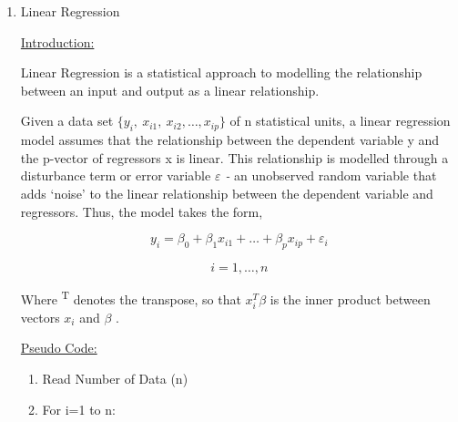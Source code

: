 \documentclass[12pt]{article}
\renewcommand{\_}{\kern-1.5pt\textunderscore\kern-1.5pt}
\begin{document}
\vspace{\baselineskip}
\begin{enumerate}
	\item {\fontsize{20pt}{24.0pt}\selectfont Linear Regression\par}\par

{\fontsize{14pt}{16.8pt}\selectfont \uline{Introduction:}\par}\par

Linear Regression is a statistical approach to modelling the relationship between an input and output as a linear relationship.\par

Given a data set  \(  \{ y_{i},~x_{i1},~x_{i2},  \ldots , x_{ip} \}  \)  of n statistical units, a linear regression model assumes that the relationship between the dependent variable y and the p-vector of regressors x is linear. This relationship is modelled through a disturbance term or error variable \textit{\textcolor[HTML]{202122}{$ \varepsilon $  -}}\textcolor[HTML]{202122}{ an unobserved random variable that adds ‘noise’ to the linear relationship between the dependent variable and regressors. Thus, the model takes the form, }\par

 \[ y_{i}=  \beta _{0}+  \beta _{1}x_{i1}+ \ldots +  \beta _{p}x_{ip}+  \varepsilon _{i} \] \par

 \[ i=1,  \ldots , n \] \par

Where \textsuperscript{T} denotes the transpose, so that  \( x_{i}^{T} \beta  \) \textbf{\textcolor[HTML]{222222}{ }}\textcolor[HTML]{222222}{is the inner product between vectors  \( x_{i} \) } and  \(  \beta  \) \textcolor[HTML]{222222}{.}\par

{\fontsize{14pt}{16.8pt}\selectfont \textcolor[HTML]{222222}{\uline{Pseudo Code:}}\par}\par

\begin{enumerate}
	\item \textcolor[HTML]{222222}{Read Number of Data (n)}\par

	\item \textcolor[HTML]{222222}{For i=1 to n:}\par


\end{enumerate}
\end{enumerate}
\end{document}
